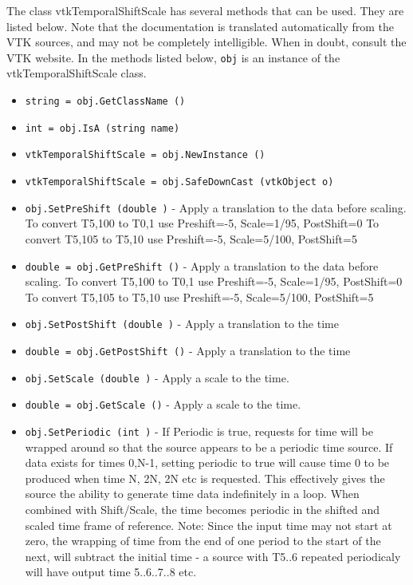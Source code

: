 The class vtkTemporalShiftScale has several methods that can be used.
  They are listed below.
Note that the documentation is translated automatically from the VTK sources,
and may not be completely intelligible.  When in doubt, consult the VTK website.
In the methods listed below, \verb|obj| is an instance of the vtkTemporalShiftScale class.
\begin{itemize}
\item  \verb|string = obj.GetClassName ()|

\item  \verb|int = obj.IsA (string name)|

\item  \verb|vtkTemporalShiftScale = obj.NewInstance ()|

\item  \verb|vtkTemporalShiftScale = obj.SafeDownCast (vtkObject o)|

\item  \verb|obj.SetPreShift (double )| -  Apply a translation to the data before scaling.
 To convert T{5,100} to T{0,1} use Preshift=-5, Scale=1/95, PostShift=0
 To convert T{5,105} to T{5,10} use Preshift=-5, Scale=5/100, PostShift=5

\item  \verb|double = obj.GetPreShift ()| -  Apply a translation to the data before scaling.
 To convert T{5,100} to T{0,1} use Preshift=-5, Scale=1/95, PostShift=0
 To convert T{5,105} to T{5,10} use Preshift=-5, Scale=5/100, PostShift=5

\item  \verb|obj.SetPostShift (double )| -  Apply a translation to the time

\item  \verb|double = obj.GetPostShift ()| -  Apply a translation to the time

\item  \verb|obj.SetScale (double )| -  Apply a scale to the time.

\item  \verb|double = obj.GetScale ()| -  Apply a scale to the time.

\item  \verb|obj.SetPeriodic (int )| -  If Periodic is true, requests for time will be wrapped around so that 
 the source appears to be a periodic time source. If data exists for times
 {0,N-1}, setting periodic to true will cause time 0 to be produced when time
 N, 2N, 2N etc is requested. This effectively gives the source the ability to
 generate time data indefinitely in a loop.
 When combined with Shift/Scale, the time becomes periodic in the 
 shifted and scaled time frame of reference.
 Note: Since the input time may not start at zero, the wrapping of time
 from the end of one period to the start of the next, will subtract the
 initial time - a source with T{5..6} repeated periodicaly will have output
 time {5..6..7..8} etc. 


\end{itemize}
